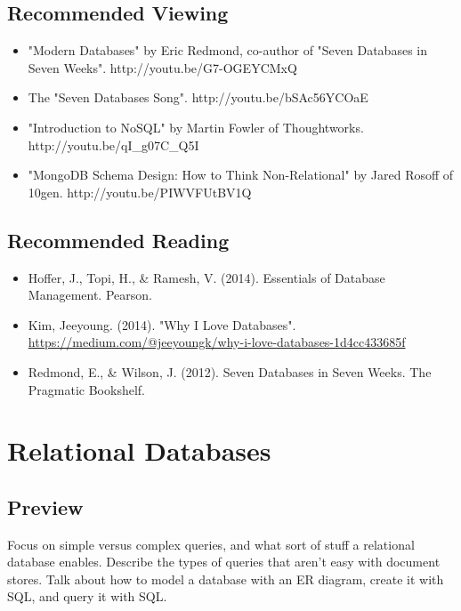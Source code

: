 \documentclass[11pt]{book}
\begin{document}
\section*{Recommended Viewing}
\begin{itemize}
    \item "Modern Databases" by Eric Redmond, co-author of "Seven Databases in Seven Weeks".  http://youtu.be/G7-OGEYCMxQ
    \item The "Seven Databases Song".  http://youtu.be/bSAc56YCOaE
    \item "Introduction to NoSQL" by Martin Fowler of Thoughtworks.\\ http://youtu.be/qI\_g07C\_Q5I
    \item "MongoDB Schema Design: How to Think Non-Relational" by Jared Rosoff of 10gen.  http://youtu.be/PIWVFUtBV1Q
\end{itemize}

\section*{Recommended Reading}
\begin{itemize}
    \item Hoffer, J., Topi, H., \& Ramesh, V. (2014). Essentials of Database Management. Pearson.
    \item Kim, Jeeyoung. (2014). "Why I Love Databases". \url{https://medium.com/@jeeyoungk/why-i-love-databases-1d4cc433685f}
    \item Redmond, E., \& Wilson, J. (2012). Seven Databases in Seven Weeks.  The Pragmatic Bookshelf.
\end{itemize}









\chapter{Relational Databases}\label{ch:sql}

\section*{Preview}

Focus on simple versus complex queries, and what sort of stuff a relational database enables.  Describe the types of queries that aren't easy with document stores.  Talk about how to model a database with an ER diagram, create it with SQL, and query it with SQL.
\end{document}
